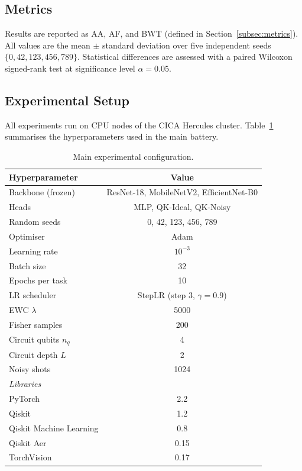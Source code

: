 \documentclass[acmlarge]{acmart}
\begin{document}
\subsection{Metrics}
\label{subsec:metrics_results}

Results are reported as AA, AF, and BWT (defined in Section~\ref{subsec:metrics}).
All values are the mean $\pm$ standard deviation over five independent seeds $\{0, 42, 123, 456, 789\}$.
Statistical differences are assessed with a paired Wilcoxon signed-rank test at significance level $\alpha = 0.05$.

\subsection{Experimental Setup}
\label{subsec:setup}

All experiments run on CPU nodes of the CICA Hercules cluster.
Table~\ref{tab:exp_config} summarises the hyperparameters used in the main battery.

\begin{table}[h]
\centering
\caption{Main experimental configuration.}
\label{tab:exp_config}
\begin{tabular}{lc}
\toprule
Hyperparameter & Value \\
\midrule
Backbone (frozen)          & ResNet-18, MobileNetV2, EfficientNet-B0 \\
Heads                      & MLP, QK-Ideal, QK-Noisy \\
Random seeds               & 0, 42, 123, 456, 789 \\
Optimiser                  & Adam \\
Learning rate              & $10^{-3}$ \\
Batch size                 & 32 \\
Epochs per task            & 10 \\
LR scheduler               & StepLR (step 3, $\gamma = 0.9$) \\
EWC $\lambda$              & 5000 \\
Fisher samples             & 200 \\
Circuit qubits $n_q$       & 4 \\
Circuit depth $L$          & 2 \\
Noisy shots                & 1024 \\
\midrule
\multicolumn{2}{l}{\textit{Libraries}} \\
PyTorch                    & 2.2 \\
Qiskit                     & 1.2 \\
Qiskit Machine Learning    & 0.8 \\
Qiskit Aer                 & 0.15 \\
TorchVision                & 0.17 \\
\bottomrule
\end{tabular}
\end{table}
\end{document}
